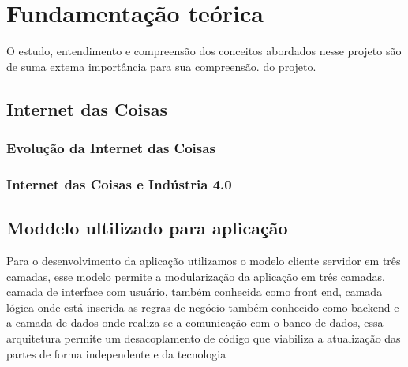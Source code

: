 \documentclass[../../layout.tex]{subfiles}
\begin{document}
\chapter{Fundamentação teórica}
\hspace*{3em}O estudo, entendimento e compreensão dos conceitos abordados nesse projeto são de suma extema importância para sua compreensão.
do projeto.

\section{Internet das Coisas}
\hspace*{3em}\blindtext[1]
\subsection{Evolução da Internet das Coisas}
\hspace*{3em}\blindtext[1]
\subsection{Internet das Coisas e Indústria 4.0}
\hspace*{3em}\blindtext[1]

\section{Moddelo ultilizado para aplicação}
\hspace*{3em}Para o desenvolvimento da aplicação  utilizamos o modelo cliente servidor em três camadas, esse modelo permite a modularização da aplicação  em três camadas,  camada de interface com usuário, também conhecida como front end, camada lógica onde está inserida as regras de negócio também conhecido como backend e a camada de dados  onde realiza-se a comunicação com o banco de dados, essa arquitetura permite um desacoplamento de código que viabiliza a atualização das partes de forma independente e da tecnologia \cite{3layers}
\end{document}

